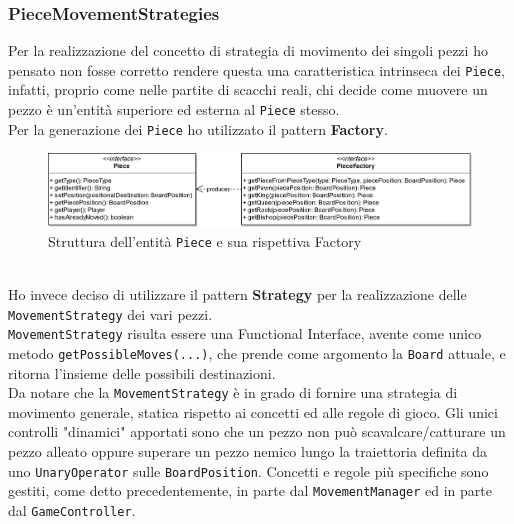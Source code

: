 \documentclass[a4paper,12pt]{report}
\begin{document}
\subsubsection*{PieceMovementStrategies}
Per la realizzazione del concetto di strategia di movimento dei singoli pezzi ho pensato non fosse corretto rendere questa una caratteristica intrinseca dei \texttt{Piece}, infatti, proprio come nelle partite di scacchi reali, chi decide come muovere un pezzo è un'entità superiore ed esterna al \texttt{Piece} stesso.\\
Per la generazione dei \texttt{Piece} ho utilizzato il pattern \textbf{Factory}.
\begin{figure}[H]
    \begin{center}
        \centering
        \includegraphics[width=\textwidth]{img/Stefano/Piece.png}
    \end{center}
    \caption{Struttura dell'entità \texttt{Piece} e sua rispettiva Factory}
    \label{img:Piece}
\end{figure}
\
\\
%
Ho invece deciso di utilizzare il pattern \textbf{Strategy}  per la realizzazione delle \texttt{MovementStrategy} dei vari pezzi. 
%
\\
\texttt{MovementStrategy} risulta essere una Functional Interface, avente come unico metodo \texttt{getPossibleMoves(...)}, che prende come argomento la \texttt{Board} attuale, e ritorna l'insieme delle possibili destinazioni.
% 
\\
Da notare che la \texttt{MovementStrategy} è in grado di fornire una strategia di movimento generale, statica rispetto ai concetti ed alle regole di gioco. Gli unici controlli "dinamici" apportati sono che un pezzo non può scavalcare/catturare un pezzo alleato oppure superare un pezzo nemico lungo la traiettoria definita da uno \texttt{UnaryOperator} sulle \texttt{BoardPosition}. Concetti e regole più specifiche sono gestiti, come detto precedentemente, in parte dal \texttt{MovementManager} ed in parte dal \texttt{GameController}.
\end{document}
